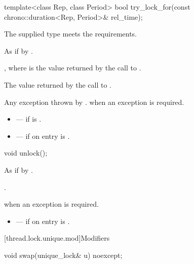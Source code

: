 %
\begin{itemdecl}
template<class Rep, class Period>
  bool try_lock_for(const chrono::duration<Rep, Period>& rel_time);
\end{itemdecl}

\begin{itemdescr}
\pnum
\expects
The supplied  type meets the  requirements.

\pnum
\effects
As if by .

\pnum
\ensures
{}, where  is the value returned by the call to .

\pnum
\returns
The value returned by the call to .

\pnum
\throws
Any exception thrown by .  when an
exception is required.

\pnum
\errors
\begin{itemize}
\item {} --- if  is .
\item {} --- if on entry  is
.
\end{itemize}
\end{itemdescr}

%
\begin{itemdecl}
void unlock();
\end{itemdecl}

\begin{itemdescr}
\pnum
\effects
As if by .

\pnum
\ensures
{}.

\pnum
\throws
{} when
an exception is required.

\pnum
\errors
\begin{itemize}
\item {} --- if on entry  is .
\end{itemize}
\end{itemdescr}

[thread.lock.unique.mod]{Modifiers}

%
\begin{itemdecl}
void swap(unique_lock& u) noexcept;
\end{itemdecl}

